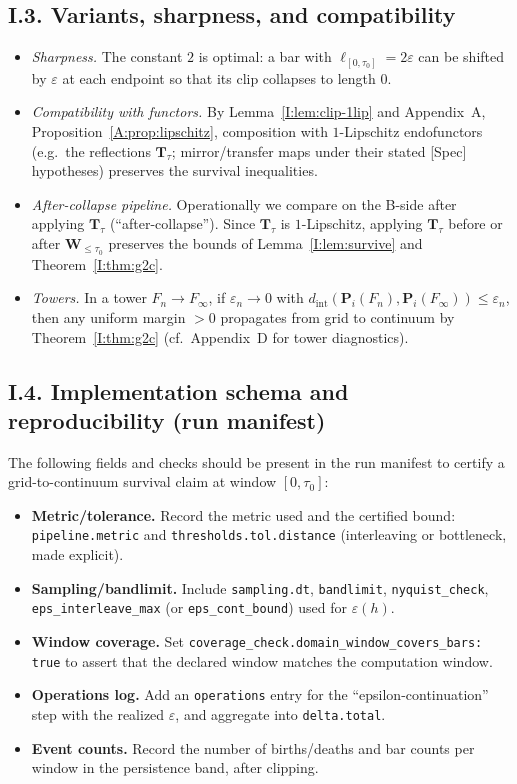 \documentclass[11pt]{article}
\numberwithin{equation}{section}
\theoremstyle{plain}
\theoremstyle{definition}
\theoremstyle{remark}
\theoremstyle{plain}
\theoremstyle{definition}
\numberwithin{equation}{section}
\theoremstyle{definition}
\numberwithin{equation}{section}
\theoremstyle{plain}
\theoremstyle{definition}
\theoremstyle{remark}
\begin{document}
\subsection*{I.3. Variants, sharpness, and compatibility}
\begin{itemize}\itemsep0.25em
\item \emph{Sharpness.} The constant \(2\) is optimal: a bar with \(\ell_{[0,\tau_0]}=2\varepsilon\) can be shifted by \(\varepsilon\) at each endpoint so that its clip collapses to length \(0\).
\item \emph{Compatibility with functors.} By Lemma~\ref{I:lem:clip-1lip} and Appendix~A, Proposition~\ref{A:prop:lipschitz}, composition with \(1\)-Lipschitz endofunctors (e.g.\ the reflections \(\mathbf{T}_\tau\); mirror/transfer maps under their stated [Spec] hypotheses) preserves the survival inequalities.
\item \emph{After-collapse pipeline.} Operationally we compare on the B-side after applying \(\mathbf{T}_\tau\) (``after-collapse''). Since \(\mathbf{T}_\tau\) is \(1\)-Lipschitz, applying \(\mathbf{T}_\tau\) before or after \(\mathbf{W}_{\le\tau_0}\) preserves the bounds of Lemma~\ref{I:lem:survive} and Theorem~\ref{I:thm:g2c}.
\item \emph{Towers.} In a tower \(F_n\to F_\infty\), if \(\varepsilon_n\to 0\) with \(d_{\mathrm{int}}(\mathbf{P}_i(F_n),\mathbf{P}_i(F_\infty))\le \varepsilon_n\), then any uniform margin \(>\!0\) propagates from grid to continuum by Theorem~\ref{I:thm:g2c} (cf.\ Appendix~D for tower diagnostics).
\end{itemize}

\subsection*{I.4. Implementation schema and reproducibility (run manifest)}
The following fields and checks should be present in the run manifest to certify a grid-to-continuum survival claim at window \([0,\tau_0]\):
\begin{itemize}
\item \textbf{Metric/tolerance.} Record the metric used and the certified bound: \texttt{pipeline.metric} and \texttt{thresholds.tol.distance} (interleaving or bottleneck, made explicit).
\item \textbf{Sampling/bandlimit.} Include \texttt{sampling.dt}, \texttt{bandlimit}, \texttt{nyquist\_check}, \texttt{eps\_interleave\_max} (or \texttt{eps\_cont\_bound}) used for \(\varepsilon(h)\).
\item \textbf{Window coverage.} Set \texttt{coverage\_check.domain\_window\_covers\_bars: true} to assert that the declared window matches the computation window.
\item \textbf{Operations log.} Add an \texttt{operations} entry for the ``epsilon-continuation'' step with the realized \(\varepsilon\), and aggregate into \texttt{delta.total}.
\item \textbf{Event counts.} Record the number of births/deaths and bar counts per window in the persistence band, after clipping.
\end{itemize}
\end{document}
